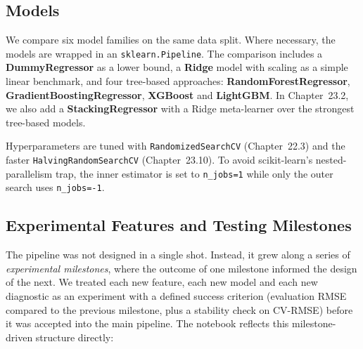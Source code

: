 \documentclass[11pt,a4paper]{article}
\begin{document}
\subsection{Models}
We compare six model families on the same data split. Where necessary, the models are wrapped in an \texttt{sklearn.Pipeline}. The comparison includes a \textbf{DummyRegressor} as a lower bound, a \textbf{Ridge} model with scaling as a simple linear benchmark, and four tree-based approaches: \textbf{RandomForestRegressor}, \textbf{GradientBoostingRegressor}, \textbf{XGBoost} and \textbf{LightGBM}. In Chapter~23.2, we also add a \textbf{StackingRegressor} with a Ridge meta-learner over the strongest tree-based models.

Hyperparameters are tuned with \texttt{RandomizedSearchCV} (Chapter~22.3) and the faster \texttt{HalvingRandomSearchCV} (Chapter~23.10). To avoid scikit-learn's nested-parallelism trap, the inner estimator is set to \texttt{n\_jobs=1} while only the outer search uses \texttt{n\_jobs=-1}.

\subsection{Experimental Features and Testing Milestones}
The pipeline was not designed in a single shot. Instead, it grew along a series of \emph{experimental milestones}, where the outcome of one milestone informed the design of the next. We treated each new feature, each new model and each new diagnostic as an experiment with a defined success criterion (evaluation RMSE compared to the previous milestone, plus a stability check on CV-RMSE) before it was accepted into the main pipeline. The notebook reflects this milestone-driven structure directly:
\end{document}
